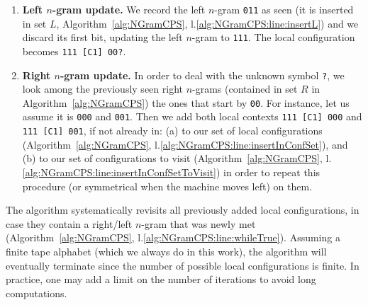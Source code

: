 \begin{enumerate}
    \item \textbf{Left $n$-gram update.} We record the left $n$-gram \texttt{011} as seen (it is inserted in set $L$, Algorithm~\ref{alg:NGramCPS}, l.\ref{alg:NGramCPS:line:insertL}) and we discard its first bit, updating the left $n$-gram to \texttt{111}. The local configuration becomes \texttt{111 [C1] 00?}.
    \item \textbf{Right $n$-gram update.} In order to deal with the unknown symbol \texttt{?}, we look among the previously seen right $n$-grams (contained in set $R$ in Algorithm~\ref{alg:NGramCPS}) the ones that start by \texttt{00}. For instance, let us assume it is \texttt{000} and \texttt{001}. Then we add both local contexts \texttt{111 [C1] 000} and \texttt{111 [C1] 001}, if not already in: (a) to our set of local configurations (Algorithm~\ref{alg:NGramCPS}, l.\ref{alg:NGramCPS:line:insertInConfSet}), and (b) to our set of configurations to visit (Algorithm~\ref{alg:NGramCPS}, l.\ref{alg:NGramCPS:line:insertInConfSetToVisit}) in order to repeat this procedure (or symmetrical when the machine moves left) on them.
\end{enumerate}

The algorithm systematically revisits all previously added local configurations, in case they contain a right/left $n$-gram that was newly met (Algorithm~\ref{alg:NGramCPS}, l.\ref{alg:NGramCPS:line:whileTrue}). Assuming a finite tape alphabet (which we always do in this work), the algorithm will eventually terminate since the number of possible local configurations is finite. In practice, one may add a limit on the number of iterations to avoid long computations.

